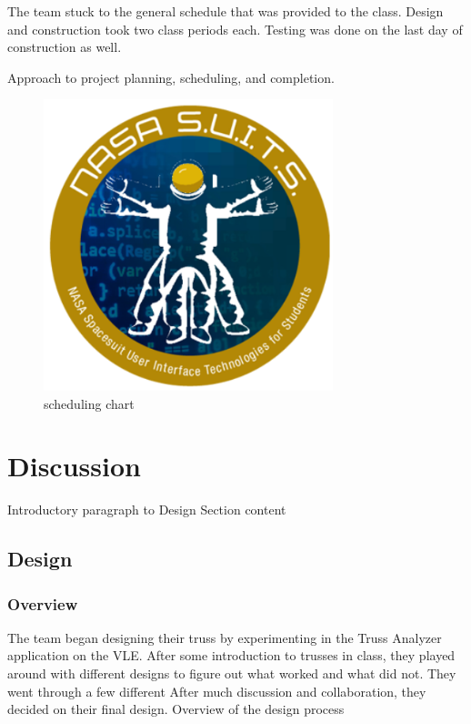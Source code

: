\documentclass{article}
\let\Oldsection\section
\renewcommand{\section}{\FloatBarrier\Oldsection}
\let\Oldsubsection\subsection
\renewcommand{\subsection}{\FloatBarrier\Oldsubsection}
\let\Oldsubsubsection\subsubsection
\renewcommand{\subsubsection}{\FloatBarrier\Oldsubsubsection}
\begin{document}
The team stuck to the general schedule that was provided to the class. Design and construction took two class periods each. Testing was done on the last day of construction as well. 

Approach to project planning, scheduling, and completion.

\begin{figure}[!htb]
  \centering
  \includegraphics[width=0.75\textwidth]{assets/logo.png}
  \caption{scheduling chart}
  \label{fig:spacesuitdisplay}
\end{figure}

\newpage

\section{Discussion}

Introductory paragraph to Design Section content

\subsection{Design}

\subsubsection{Overview}

The team began designing their truss by experimenting in the Truss Analyzer application on the VLE. After some introduction to trusses in class, they played around with different designs to figure out what worked and what did not. They went through a few different  After much discussion and collaboration, they decided on their final design.
Overview of the design process
\end{document}

